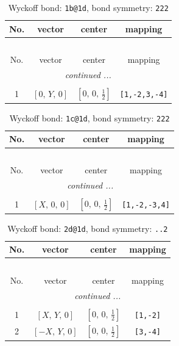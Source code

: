 \documentclass[fleqn,8pt]{jsarticle}
\begin{document}
\begin{longtable}{cccc}
\caption{Wyckoff bond: {\tt 1b@1d}, bond symmetry: {\tt 222}}
 \\
 \hline \hline
No. & vector & center & mapping \\ \hline \endfirsthead

\multicolumn{3}{l}{\tablename\ \thetable{}} \\
 \hline \hline
No. & vector & center & mapping \\ \hline \endhead

 \hline \hline
\multicolumn{3}{r}{\footnotesize\it continued ...} \\ \endfoot

 \hline \hline
\multicolumn{3}{r}{} \\ \endlastfoot

1 & $\left[ 0,\, Y,\, 0 \right]$ & $\left[ 0,\, 0,\, \frac{1}{2} \right]$ & {\tt [1,-2,3,-4]} \\
\end{longtable}
\renewcommand{\arraystretch}{1.2}
\begin{longtable}{cccc}
\caption{Wyckoff bond: {\tt 1c@1d}, bond symmetry: {\tt 222}}
 \\
 \hline \hline
No. & vector & center & mapping \\ \hline \endfirsthead

\multicolumn{3}{l}{\tablename\ \thetable{}} \\
 \hline \hline
No. & vector & center & mapping \\ \hline \endhead

 \hline \hline
\multicolumn{3}{r}{\footnotesize\it continued ...} \\ \endfoot

 \hline \hline
\multicolumn{3}{r}{} \\ \endlastfoot

1 & $\left[ X,\, 0,\, 0 \right]$ & $\left[ 0,\, 0,\, \frac{1}{2} \right]$ & {\tt [1,-2,-3,4]} \\
\end{longtable}
\renewcommand{\arraystretch}{1.2}
\begin{longtable}{cccc}
\caption{Wyckoff bond: {\tt 2d@1d}, bond symmetry: {\tt ..2}}
 \\
 \hline \hline
No. & vector & center & mapping \\ \hline \endfirsthead

\multicolumn{3}{l}{\tablename\ \thetable{}} \\
 \hline \hline
No. & vector & center & mapping \\ \hline \endhead

 \hline \hline
\multicolumn{3}{r}{\footnotesize\it continued ...} \\ \endfoot

 \hline \hline
\multicolumn{3}{r}{} \\ \endlastfoot

1 & $\left[ X,\, Y,\, 0 \right]$ & $\left[ 0,\, 0,\, \frac{1}{2} \right]$ & {\tt [1,-2]} \\ \hline
2 & $\left[ - X,\, Y,\, 0 \right]$ & $\left[ 0,\, 0,\, \frac{1}{2} \right]$ & {\tt [3,-4]} \\
\end{longtable}
\end{document}
